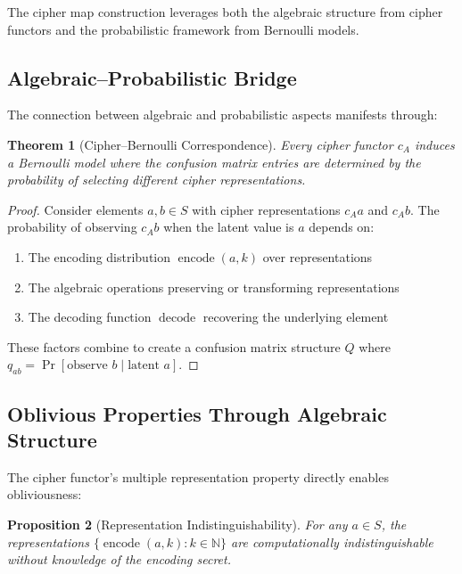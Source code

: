 \documentclass[11pt]{article}
\theoremstyle{definition}
\theoremstyle{plain}
\newtheorem{theorem}{Theorem}[section]
\newtheorem{proposition}[theorem]{Proposition}
\theoremstyle{remark}
\newcommand{\cipher}[1]{c_{#1}}
\newcommand{\encode}{\operatorname{encode}}
\newcommand{\decode}{\operatorname{decode}}
\begin{document}
The cipher map construction leverages both the algebraic structure from cipher functors and the probabilistic framework from Bernoulli models.

\subsection{Algebraic--Probabilistic Bridge}

The connection between algebraic and probabilistic aspects manifests through:

\begin{theorem}[Cipher--Bernoulli Correspondence]
\label{thm:cipher-bernoulli}
Every cipher functor $\cipher{A}$ induces a Bernoulli model where the confusion matrix entries are determined by the probability of selecting different cipher representations.
\end{theorem}

\begin{proof}
Consider elements $a, b \in S$ with cipher representations $\cipher{A} a$ and $\cipher{A} b$. The probability of observing $\cipher{A} b$ when the latent value is $a$ depends on:
\begin{enumerate}
\item The encoding distribution $\encode(a, k)$ over representations
\item The algebraic operations preserving or transforming representations
\item The decoding function $\decode$ recovering the underlying element
\end{enumerate}
These factors combine to create a confusion matrix structure $Q$ where $q_{ab} = \Pr[\text{observe } b \mid \text{latent } a]$.
\end{proof}

\subsection{Oblivious Properties Through Algebraic Structure}

The cipher functor's multiple representation property directly enables obliviousness:

\begin{proposition}[Representation Indistinguishability]
\label{prop:indistinguishable}
For any $a \in S$, the representations $\{\encode(a,k) : k \in \mathbb{N}\}$ are computationally indistinguishable without knowledge of the encoding secret.
\end{proposition}
\end{document}
